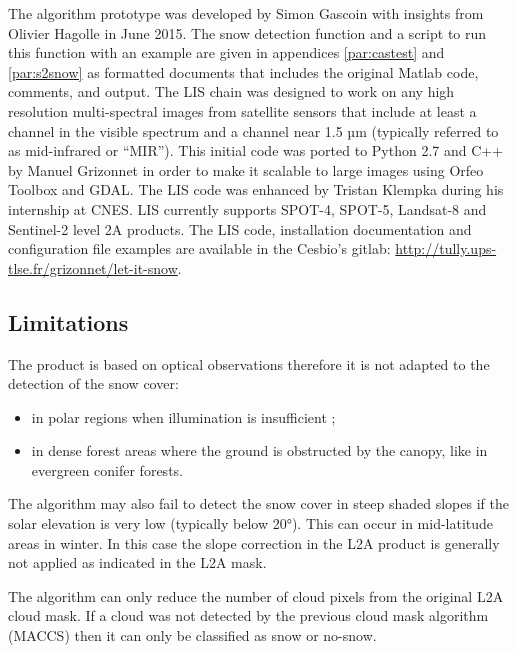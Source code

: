 \documentclass[a4paper]{article}
\begin{document}
The algorithm prototype was developed by Simon Gascoin with insights from Olivier Hagolle in June 2015.  The snow detection function and a script to run this function with an example are given in appendices \ref{par:castest} and \ref{par:s2snow} as formatted documents that includes the original Matlab code, comments, and output. The LIS chain was designed to work on any high resolution multi-spectral images from satellite sensors that include at least a channel in the visible spectrum and a channel near 1.5 µm (typically referred to as mid-infrared or ``MIR''). This initial code was ported to Python 2.7 and C++ by Manuel Grizonnet in order to make it scalable to large images using Orfeo Toolbox and GDAL. The LIS code was enhanced by Tristan Klempka during his internship at CNES. LIS currently supports SPOT-4, SPOT-5, Landsat-8 and Sentinel-2 level 2A products. The LIS code, installation documentation and configuration file examples are available in the Cesbio's gitlab: \url{http://tully.ups-tlse.fr/grizonnet/let-it-snow}. 

\subsection{Limitations}

The product is based on optical observations therefore it is not adapted to the detection of the snow cover:

\begin{itemize}
 \item in polar regions when illumination is insufficient ;
  \item in dense forest areas where the ground is obstructed by the canopy, like in evergreen conifer forests.
 \end{itemize}
 
The algorithm may also fail to detect the snow cover in steep shaded slopes if the solar elevation is very low (typically below 20°). This can occur in mid-latitude areas in winter. In this case the slope correction in the L2A product is generally not applied as indicated in the L2A mask.

The algorithm can only reduce the number of cloud pixels from the original L2A cloud mask. If a cloud was not detected by the previous cloud mask algorithm (MACCS) then it can only be classified as snow or no-snow. 
\end{document}
